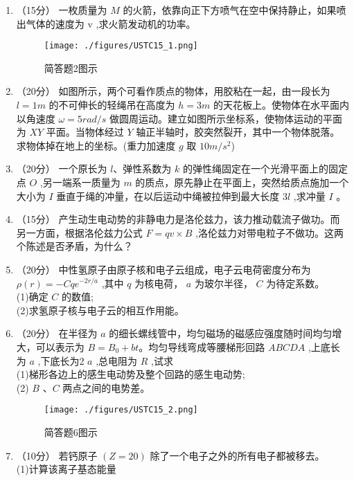 

\begin{enumerate}
\item （15分）
一枚质量为 $M$ 的火箭，依靠向正下方喷气在空中保持静止，如果喷出气体的速度为  $\mathrm v$ ,求火箭发动机的功率。\\
\begin{figure}[ht]
\centering
\texttt{[image: ./figures/USTC15\_1.png]}
\caption{简答题2图示} \label{USTC15_fig1}
\end{figure}
\item （20分）
如图所示，两个可看作质点的物体，用胶粘在一起，由一段长为 $l=1m$ 的不可伸长的轻绳吊在高度为 $h=3m$ 的天花板上。使物体在水平面内以角速度 $\omega=5rad/s$ 做圆周运动。建立如图所示坐标系，使物体运动的平面为 $XY$ 平面。当物体经过 $Y$ 轴正半轴时，胶突然裂开，其中一个物体脱落。求物体掉在地上的坐标。(重力加速度 $g$ 取 $10m/s^2$)
\item （20分）
一个原长为 $l$、弹性系数为 $k$ 的弹性绳固定在一个光滑平面上的固定点 $O$ ,另一端系一质量为 $m$ 的质点，原先静止在平面上，突然给质点施加一个大小为 $I$ 垂直于绳的冲量，在以后运动中绳被拉伸到最大长度 3$l$ ,求冲量 $I$ 。
\item （15分）
产生动生电动势的非静电力是洛伦兹力，该力推动载流子做功。而另一方面，根据洛伦兹力公式 $F=qv\times B$ ,洛伦兹力对带电粒子不做功。这两个陈述是否矛盾，为什么？
\item （20分）
中性氢原子由原子核和电子云组成，电子云电荷密度分布为 $\rho(r)=-Cqe^{-2r/a}$ ,其中 $q$ 为核电荷， $a$ 为玻尔半径， $C$ 为待定系数。\\
(1)确定 $C$ 的数值;\\
(2)求氢原子核与电子云的相互作用能。
\item （20分）
在半径为 $a$ 的细长螺线管中，均匀磁场的磁感应强度随时间均匀增大，可以表示为 $B=B_0+bt$。均匀导线弯成等腰梯形回路 $ABCDA$ ,上底长为 $a$ ,下底长为2 $a$ ,总电阻为 $R$ ,试求\\
(1)梯形各边上的感生电动势及整个回路的感生电动势;\\
(2) $B$ 、$C$ 两点之间的电势差。\\
\begin{figure}[ht]
\centering
\texttt{[image: ./figures/USTC15\_2.png]}
\caption{简答题6图示} \label{USTC15_fig2}
\end{figure}
\item （10分）
若钙原子 $(Z=20)$ 除了一个电子之外的所有电子都被移去。\\
(1)计算该离子基态能量\\

\end{enumerate}
